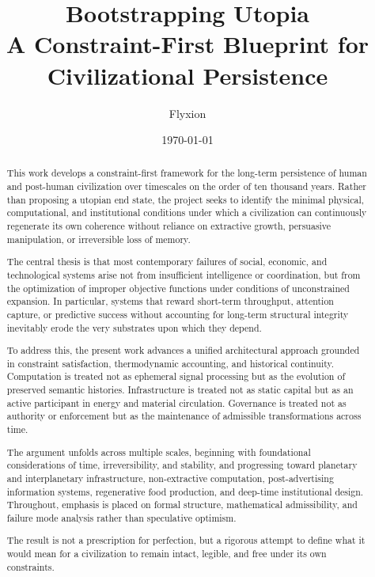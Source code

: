 \documentclass[12pt,oneside]{book}
\title{\textbf{Bootstrapping Utopia}\\
\vspace{0.5em}
\large A Constraint-First Blueprint for Civilizational Persistence}
\author{Flyxion}
\date{\today}
\begin{document}
\frontmatter
\maketitle

\begin{abstract}
This work develops a constraint-first framework for the long-term persistence of human and post-human civilization over timescales on the order of ten thousand years. Rather than proposing a utopian end state, the project seeks to identify the minimal physical, computational, and institutional conditions under which a civilization can continuously regenerate its own coherence without reliance on extractive growth, persuasive manipulation, or irreversible loss of memory.

The central thesis is that most contemporary failures of social, economic, and technological systems arise not from insufficient intelligence or coordination, but from the optimization of improper objective functions under conditions of unconstrained expansion. In particular, systems that reward short-term throughput, attention capture, or predictive success without accounting for long-term structural integrity inevitably erode the very substrates upon which they depend.

To address this, the present work advances a unified architectural approach grounded in constraint satisfaction, thermodynamic accounting, and historical continuity. Computation is treated not as ephemeral signal processing but as the evolution of preserved semantic histories. Infrastructure is treated not as static capital but as an active participant in energy and material circulation. Governance is treated not as authority or enforcement but as the maintenance of admissible transformations across time.

The argument unfolds across multiple scales, beginning with foundational considerations of time, irreversibility, and stability, and progressing toward planetary and interplanetary infrastructure, non-extractive computation, post-advertising information systems, regenerative food production, and deep-time institutional design. Throughout, emphasis is placed on formal structure, mathematical admissibility, and failure mode analysis rather than speculative optimism.

The result is not a prescription for perfection, but a rigorous attempt to define what it would mean for a civilization to remain intact, legible, and free under its own constraints.
\end{abstract}
\end{document}
